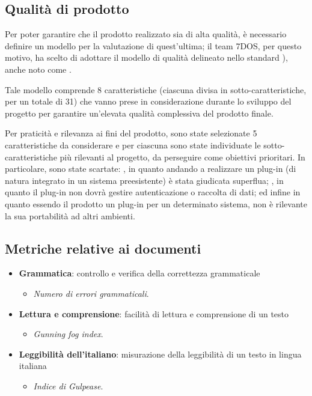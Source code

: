 \subsection{Qualità di prodotto}
Per poter garantire che il prodotto realizzato sia di alta qualità, è necessario definire un modello per la valutazione di quest'ultima; il team 7DOS, per questo motivo, ha scelto di adottare il modello di qualità delineato nello standard ), anche noto come .

Tale modello comprende 8 caratteristiche (ciascuna divisa in sotto-caratteristiche, per un totale di 31) che vanno prese in considerazione durante lo sviluppo del progetto per garantire un'elevata qualità complessiva del prodotto finale.

Per praticità e rilevanza ai fini del prodotto, sono state selezionate 5 caratteristiche da considerare e per ciascuna sono state individuate le sotto-caratteristiche più rilevanti al progetto, da perseguire come obiettivi prioritari. In particolare, sono state scartate: , in quanto andando a realizzare un plug-in (di natura integrato in un sistema preesistente) è stata giudicata superflua; , in quanto il plug-in non dovrà gestire autenticazione o raccolta di dati; ed infine  in quanto essendo il prodotto un plug-in per un determinato sistema, non è rilevante la sua portabilità ad altri ambienti. 

\subsection{Metriche relative ai documenti}

\begin{itemize}
	\item{\textbf{Grammatica}: controllo e verifica della correttezza grammaticale
		\begin{itemize}
			\item{\emph{Numero di errori grammaticali}.}
		\end{itemize}	
	}
	\item{\textbf{Lettura e comprensione}: facilità di lettura e comprensione di un testo
		\begin{itemize}
			\item{\emph{Gunning fog index}.}
		\end{itemize}	
	}
	\item{\textbf{Leggibilità dell'italiano}: misurazione della leggibilità di un testo in lingua italiana
	\begin{itemize}
		\item{\emph{Indice di Gulpease}.}
	\end{itemize}	
	}
\end{itemize}
\pagebreak
